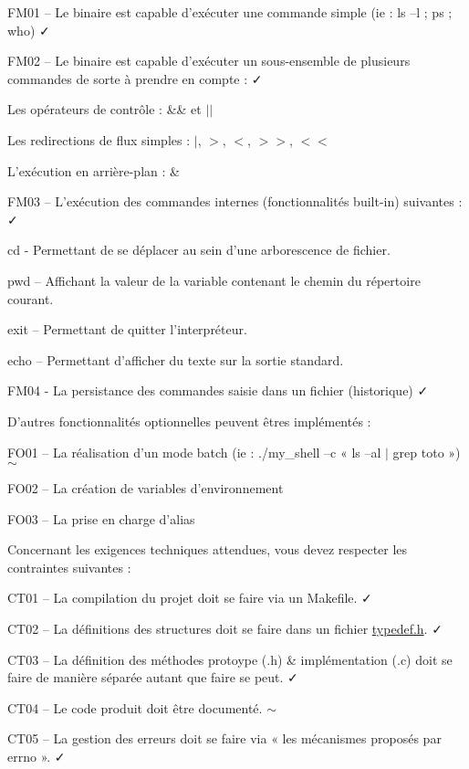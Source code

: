 \begin{DoxyItemize}
\item F\+M01 – Le binaire est capable d’exécuter une commande simple (ie \+: ls –l ; ps ; who) ✓
\item F\+M02 – Le binaire est capable d’exécuter un sous-\/ensemble de plusieurs commandes de sorte à prendre en compte \+: ✓
\begin{DoxyItemize}
\item Les opérateurs de contrôle \+: \&\& et $\vert$$\vert$
\item Les redirections de flux simples \+: $\vert$, $>$, $<$, $>$$>$, $<$$<$
\item L’exécution en arrière-\/plan \+: \&
\end{DoxyItemize}
\item F\+M03 – L’exécution des commandes internes (fonctionnalités built-\/in) suivantes \+: ✓
\begin{DoxyItemize}
\item cd -\/ Permettant de se déplacer au sein d’une arborescence de fichier.
\item pwd – Affichant la valeur de la variable contenant le chemin du répertoire courant.
\item exit – Permettant de quitter l’interpréteur.
\item echo – Permettant d’afficher du texte sur la sortie standard.
\end{DoxyItemize}
\item F\+M04 -\/ La persistance des commandes saisie dans un fichier (historique) ✓
\end{DoxyItemize}

D’autres fonctionnalités optionnelles peuvent êtres implémentés \+:


\begin{DoxyItemize}
\item F\+O01 – La réalisation d’un mode batch (ie \+: ./my\+\_\+shell –c « ls –al $\vert$ grep toto ») $\sim$
\item F\+O02 – La création de variables d’environnement
\item F\+O03 – La prise en charge d’alias
\end{DoxyItemize}

Concernant les exigences techniques attendues, vous devez respecter les contraintes suivantes \+:


\begin{DoxyItemize}
\item C\+T01 – La compilation du projet doit se faire via un Makefile. ✓
\item C\+T02 – La définitions des structures doit se faire dans un fichier \hyperlink{typedef_8h}{typedef.\+h}. ✓
\item C\+T03 – La définition des méthodes protoype (.h) \& implémentation (.c) doit se faire de manière séparée autant que faire se peut. ✓
\item C\+T04 – Le code produit doit être documenté. $\sim$
\item C\+T05 – La gestion des erreurs doit se faire via « les mécanismes proposés par errno ». ✓
\end{DoxyItemize}


